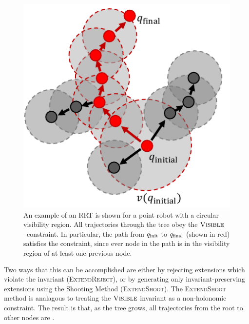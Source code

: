 \documentclass[conference]{IEEEtran}
\begin{document}
\begin{figure}
	\includegraphics[width=1.0\columnwidth]{img/sphere_tree.pdf}
	\caption{An example of an RRT is shown for a point robot with a circular
	visibility region. All trajectories through the tree obey the
	$\textsc{Visible}$~constraint. In particular, the path from $q_{\text{init}}$ to $q_{\text{final}}$ (shown in
	red) satisfies the constraint, since ever node in the path is in the visibility
	region of at least one previous node.}
	\label{fig:sphere_tree}
\end{figure}

Two ways that this can be accomplished are either by rejecting extensions which
violate the invariant (\textsc{ExtendReject}), or by generating only
invariant-preserving extensions using the Shooting Method
(\textsc{ExtendShoot}). The \textsc{ExtendShoot} method is analagous to treating
the $\textsc{Visible}$ invariant as a non-holonomic constraint. The result is that, as the
tree grows, all trajectories from the root to other nodes are \vis.
\end{document}
